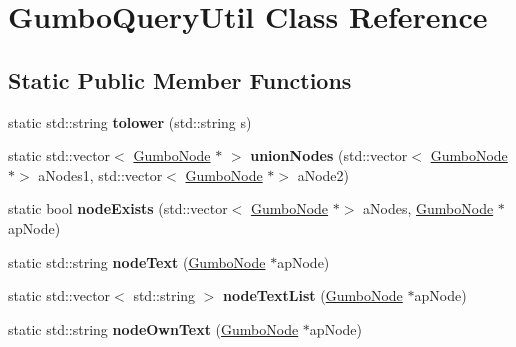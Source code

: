 \hypertarget{class_gumbo_query_util}{}\section{Gumbo\+Query\+Util Class Reference}
\label{class_gumbo_query_util}
\subsection*{Static Public Member Functions}
\begin{DoxyCompactItemize}
\item 
\mbox{\label{class_gumbo_query_util_a6c60302459c017d28ae9b2a00ca7596a}} 
static std\+::string {\bfseries tolower} (std\+::string s)
\item 
\mbox{\label{class_gumbo_query_util_a3613b992c76ef517a9a205f7b7e38310}} 
static std\+::vector$<$ \mbox{\hyperlink{gumbo_8h_a5f67d8397fda8fb7c90cc27f14ac4e7d}{Gumbo\+Node}} $\ast$ $>$ {\bfseries union\+Nodes} (std\+::vector$<$ \mbox{\hyperlink{gumbo_8h_a5f67d8397fda8fb7c90cc27f14ac4e7d}{Gumbo\+Node}} $\ast$$>$ a\+Nodes1, std\+::vector$<$ \mbox{\hyperlink{gumbo_8h_a5f67d8397fda8fb7c90cc27f14ac4e7d}{Gumbo\+Node}} $\ast$$>$ a\+Node2)
\item 
\mbox{\label{class_gumbo_query_util_adc573498e9b3a6fbccbb537a09f69f4b}} 
static bool {\bfseries node\+Exists} (std\+::vector$<$ \mbox{\hyperlink{gumbo_8h_a5f67d8397fda8fb7c90cc27f14ac4e7d}{Gumbo\+Node}} $\ast$$>$ a\+Nodes, \mbox{\hyperlink{gumbo_8h_a5f67d8397fda8fb7c90cc27f14ac4e7d}{Gumbo\+Node}} $\ast$ap\+Node)
\item 
\mbox{\label{class_gumbo_query_util_a4df9ddd4fb5b7491c4333cffece536be}} 
static std\+::string {\bfseries node\+Text} (\mbox{\hyperlink{gumbo_8h_a5f67d8397fda8fb7c90cc27f14ac4e7d}{Gumbo\+Node}} $\ast$ap\+Node)
\item 
\mbox{\label{class_gumbo_query_util_a50737dac47bad3bfe25f3ae68c2577bb}} 
static std\+::vector$<$ std\+::string $>$ {\bfseries node\+Text\+List} (\mbox{\hyperlink{gumbo_8h_a5f67d8397fda8fb7c90cc27f14ac4e7d}{Gumbo\+Node}} $\ast$ap\+Node)
\item 
\mbox{\label{class_gumbo_query_util_a88f228dc0402a6a50e3dc6ea08fa873e}} 
static std\+::string {\bfseries node\+Own\+Text} (\mbox{\hyperlink{gumbo_8h_a5f67d8397fda8fb7c90cc27f14ac4e7d}{Gumbo\+Node}} $\ast$ap\+Node)
\end{DoxyCompactItemize}


